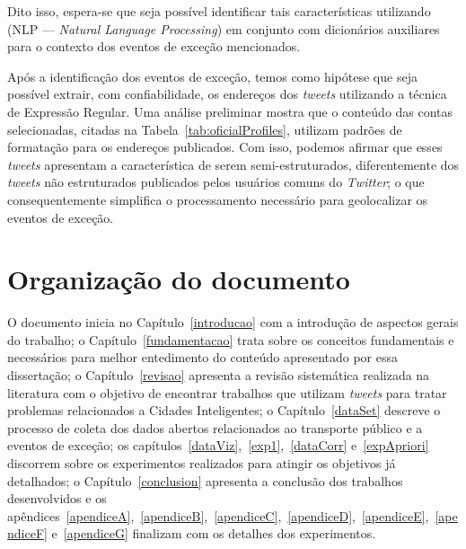 \documentclass[
	12pt,				%
	oneside,			%
	a4paper,			%
	english,			%
	brazil				%
	]{abntex2ppgsi}
\begin{document}
{\begin{enumerate}
\end{enumerate}

Dito isso, espera-se que seja possível identificar tais características utilizando  (NLP --- \textit{Natural Language Processing}) em conjunto com dicionários auxiliares para o contexto dos eventos de exceção mencionados.

Após a identificação dos eventos de exceção, temos como hipótese que seja possível extrair, com confiabilidade, os endereços dos \textit{tweets} utilizando a técnica de Expressão Regular. Uma análise preliminar mostra que o conteúdo das contas selecionadas, citadas na Tabela~\ref{tab:oficialProfiles}, utilizam padrões de formatação para os endereços publicados. Com isso, podemos afirmar que esses \textit{tweets} apresentam a característica de serem semi-estruturados, diferentemente dos \textit{tweets} não estruturados publicados pelos usuários comuns do \textit{Twitter}; o que consequentemente simplifica o processamento necessário para geolocalizar os eventos de exceção.

\section{Organização do documento}
\label{docOrg}

O  documento inicia no Capítulo~\ref{introducao} com a introdução de aspectos gerais do trabalho; o Capítulo~\ref{fundamentacao} trata sobre os conceitos fundamentais e necessários para melhor entedimento do conteúdo apresentado por essa dissertação; o  Capítulo~\ref{revisao} apresenta a revisão sistemática realizada na literatura com o objetivo de encontrar trabalhos que utilizam \textit{tweets} para tratar problemas relacionados a Cidades Inteligentes; o Capítulo~\ref{dataSet} descreve o processo de coleta dos dados abertos relacionados ao transporte público e a eventos de exceção; os capítulos~\ref{dataViz},~\ref{exp1},~\ref{dataCorr} e~\ref{expApriori} discorrem sobre os experimentos realizados para atingir os objetivos já detalhados; o Capítulo~\ref{conclusion} apresenta a conclusão dos trabalhos desenvolvidos e os apêndices~\ref{apendiceA},~\ref{apendiceB},~\ref{apendiceC},~\ref{apendiceD},~\ref{apendiceE},~\ref{apendiceF} e~\ref{apendiceG} finalizam com os detalhes dos experimentos.

}
\end{document}
